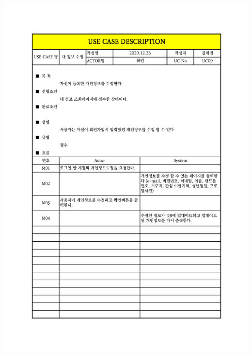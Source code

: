 {{{{{{{{{{\includegraphics[width=1.1\textwidth]{./Figure/Design/Display/usecase/009.pdf} \\
}}}}}}}}}}
